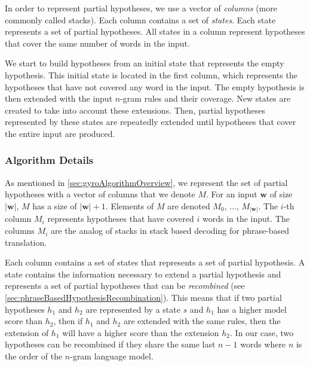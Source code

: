 In order to represent partial hypotheses, we use a vector
of \emph{columns} (more commonly called stacks). Each
column contains a set of
\emph{states}. Each state represents a set of partial hypotheses.
All states in a column represent hypotheses that cover
the same number of words in the input.

We start to build hypotheses from an initial state that
represents the empty hypothesis. This initial state
is located in the first column, which represents the
hypotheses that have not covered any word in the input.
The empty hypothesis is then extended with the input
$n$-gram rules and their coverage. New states are created
to take into account these extensions. Then, partial
hypotheses represented by these states are repeatedly
extended until hypotheses that cover the entire input
are produced.

\subsubsection{Algorithm Details}
\label{sec:gyroAlgoDetails}

As mentioned in \ref{sec:gyroAlgorithmOverview}, we represent
the set of
partial hypotheses with a vector of columns that we denote
$M$. For an input $\bm{w}$ of size $|\bm{w}|$, $M$ has a size
of $|\bm{w}| + 1$. Elements of $M$ are denoted $M_0$, ..., $M_{|\bm{w}|}$.
The $i$-th column $M_i$ represents hypotheses that have covered
$i$ words in the input. The columns $M_i$ are the analog of stacks
in stack based decoding for phrase-based translation.

Each column contains a set of states that represents a set of partial
hypothesis. A state contains the information necessary to
extend a partial hypothesis and represents a set of
partial hypotheses that can
be \emph{recombined} (see \autoref{sec:phraseBasedHypothesisRecombination}).
This means that if two partial hypotheses $h_1$ and $h_2$
are represented by a state $s$ and $h_1$ has a higher model score than
$h_2$, then if $h_1$ and $h_2$ are extended with the same rules, then
the extension of $h_1$ will have a higher score than the extension $h_2$.
In our case, two hypotheses can be recombined if they share the same last
$n - 1$ words where $n$ is the order of the $n$-gram language model.

